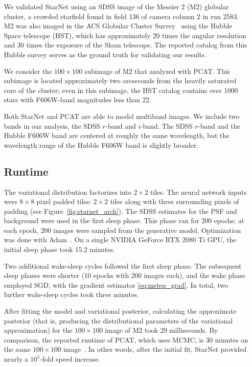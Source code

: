 \label{sec:results_on_m2}
We validated StarNet using an SDSS image of the Messier 2 (M2) globular cluster, a crowded starfield found in field 136 of camera column 2 in run 2583.
M2 was also imaged in the ACS Globular Cluster Survey~\cite{Sarajedini_2007}
using the Hubble Space telescope (HST),
which has approximately 20 times the angular resolution and 30 times the exposure of the Sloan telescope. The reported catalog from this Hubble survey serves as the ground truth for validating our results.

We consider the $100 \times 100$ subimage of M2 that \cite{Portillo_2017, Feder_2019} analyzed with PCAT.
This subimage is located approximately two arcseconds from the heavily saturated core of the cluster;
even in this subimage, the HST catalog contains over 1000 stars with F606W-band magnitudes less than 22.

Both StarNet and PCAT are able to model multiband images. We include two bands in our analysis, the SDSS $r$-band and $i$-band. 
The SDSS $r$-band and the Hubble F606W band are centered at roughly the same wavelength, but the wavelength range of the Hubble F606W band is slightly broader. 

\subsection{Runtime} 
\label{sec:runtime}
The variational distribution factorizes into $2\times2$ tiles. 
The neural network inputs were $8\times8$ pixel padded tiles: 
$2\times 2$ tiles along with three surrounding pixels of padding (see Figure~\ref{fig:starnet_arch}). 
The SDSS estimates for the PSF and background were used in the first sleep phase. 
This phase ran for 200 epochs; at each epoch, 200 images were sampled from the generative model. 
Optimization was done with Adam~\cite{kingma2014adam}. 
On a single NVIDIA GeForce RTX 2080 Ti GPU, 
the initial sleep phase took 15.2 minutes.

Two additional wake-sleep cycles followed the first sleep phase. 
The subsequent sleep phases were shorter (10 epochs with 200 images each), and the wake phase employed SGD, with the gradient estimator \eqref{eq:mstep_grad}. In total, two further wake-sleep cycles took three minutes. 

After fitting the model and variational posterior, calculating the approximate posterior (that is, producing the distributional parameters of the variational approximation) for the $100 \times 100$ image of M2 took $29$ milliseconds. 
By comparison, the reported runtime of PCAT, which uses MCMC, is 30 minutes on the same $100 \times 100$ image~\cite{Feder_2019}.
In other words, after the initial fit, StarNet provided nearly a $10^5$-fold speed increase. 

